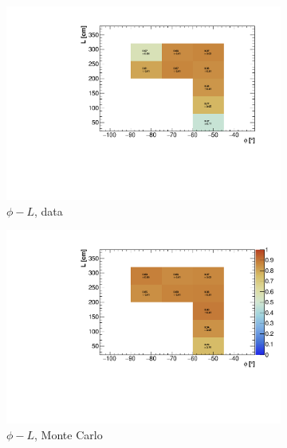 \documentclass[a4paper]{scrartcl}
\begin{document}
\begin{figure}[htbp]
\begin{center}
\begin{subfigure}{0.52\textwidth}
\includegraphics[width=\linewidth]{figures/phi_l_data.pdf}
\caption{$\phi - L$, data} \label{fig:2d_cry_3}
\end{subfigure}\begin{subfigure}{0.52\textwidth}
\includegraphics[width=\linewidth]{figures/phi_l_mc.pdf}
\caption{$\phi - L$, Monte Carlo}\label{fig:2d_cry_mc_3}
\end{subfigure}
\begin{subfigure}{0.52\textwidth}

\end{subfigure}
\end{center}
\end{figure}
\end{document}
